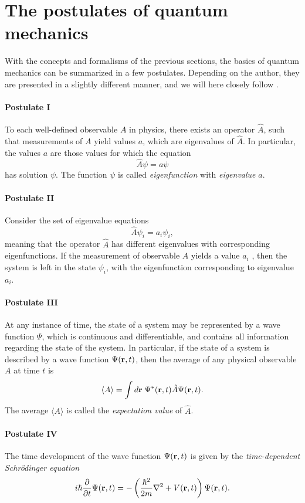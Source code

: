 \section{The postulates of quantum mechanics}
With the concepts and formalisms of the previous sections, the basics of quantum mechanics can be summarized in a few postulates. Depending on the author, they are presented in a slightly different manner, and we will here closely follow \cite{liboff1992introductory}.

\paragraph{Postulate I}
To each well-defined observable $A$ in physics, there exists an operator $\hat{A}$, such that measurements of $A$ yield values $a$, which are eigenvalues of $\hat{A}$. In particular, the values $a$ are those values for which the equation
\[
\hat{A}\psi = a\psi
\]
has solution $\psi$. The function $\psi$ is called \textit{eigenfunction} with \textit{eigenvalue} $a$.

\paragraph{Postulate II}
Consider the set of eigenvalue equations
\[
\hat{A}\psi_i = a_i\psi_i,
\]
meaning that the operator $\hat{A}$ has different eigenvalues with corresponding eigenfunctions. If the measurement of observable $A$ yields a value $a_i$ , then the system is left in the state $\psi_i$, with the eigenfunction corresponding to eigenvalue $a_i$.

\paragraph{Postulate III}
At any instance of time, the state of a system may be represented by a wave function $\Psi$, which is continuous and differentiable, and contains all information regarding the state of the system. In particular, if the state of a system is described by a wave function $\Psi(\mathbf{r},t)$, then the average of any physical observable $A$ at time $t$ is
\[
\langle A \rangle = \int d\mathbf{r}\; \Psi^*(\mathbf{r},t)\hat{A}\Psi(\mathbf{r},t).
\]
The average $\langle A \rangle$ is called the \textit{expectation value} of $\hat{A}$.

\paragraph{Postulate IV}
The time development of the wave function $\Psi(\mathbf{r},t)$ is given by the \textit{time-dependent Schr\"odinger equation}
\[
i\hbar \frac{\partial}{\partial t}\Psi(\mathbf{r},t) = - \left(\frac{\hbar^2}{2m}\nabla^2 + V(\mathbf{r},t)\right) \Psi(\mathbf{r},t).
\]

